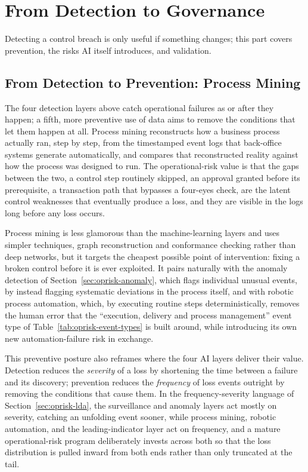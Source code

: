 \documentclass[../ai_in_finance]{subfiles}
\begin{document}
\section{From Detection to Governance}

Detecting a control breach is only useful if something changes; this part covers prevention, the risks AI itself introduces, and validation.

\subsection{From Detection to Prevention: Process Mining}
\label{sec:oprisk-process-mining}

The four detection layers above catch operational failures as or after they happen; a fifth, more preventive use of data aims to remove the conditions that let them happen at all. Process mining reconstructs how a business process actually ran, step by step, from the timestamped event logs that back-office systems generate automatically, and compares that reconstructed reality against how the process was designed to run. The operational-risk value is that the gaps between the two, a control step routinely skipped, an approval granted before its prerequisite, a transaction path that bypasses a four-eyes check, are the latent control weaknesses that eventually produce a loss, and they are visible in the logs long before any loss occurs.

Process mining is less glamorous than the machine-learning layers and uses simpler techniques, graph reconstruction and conformance checking rather than deep networks, but it targets the cheapest possible point of intervention: fixing a broken control before it is ever exploited. It pairs naturally with the anomaly detection of Section~\ref{sec:oprisk-anomaly}, which flags individual unusual events, by instead flagging systematic deviations in the process itself, and with robotic process automation, which, by executing routine steps deterministically, removes the human error that the ``execution, delivery and process management'' event type of Table~\ref{tab:oprisk-event-types} is built around, while introducing its own new automation-failure risk in exchange.

This preventive posture also reframes where the four AI layers deliver their value. Detection reduces the \emph{severity} of a loss by shortening the time between a failure and its discovery; prevention reduces the \emph{frequency} of loss events outright by removing the conditions that cause them. In the frequency-severity language of Section~\ref{sec:oprisk-lda}, the surveillance and anomaly layers act mostly on severity, catching an unfolding event sooner, while process mining, robotic automation, and the leading-indicator layer act on frequency, and a mature operational-risk program deliberately invests across both so that the loss distribution is pulled inward from both ends rather than only truncated at the tail.
\end{document}
